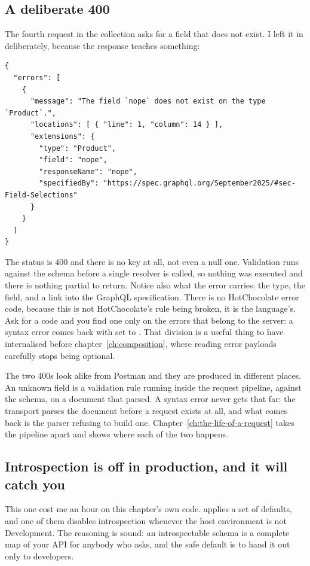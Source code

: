 \subsection*{A deliberate 400}

%
The fourth request in the collection asks for a field that does not exist. I
left it in deliberately, because the response teaches something:

\begin{verbatim}
{
  "errors": [
    {
      "message": "The field `nope` does not exist on the type `Product`.",
      "locations": [ { "line": 1, "column": 14 } ],
      "extensions": {
        "type": "Product",
        "field": "nope",
        "responseName": "nope",
        "specifiedBy": "https://spec.graphql.org/September2025/#sec-Field-Selections"
      }
    }
  ]
}
\end{verbatim}

The status is 400 and there is no  key at all, not even a null one.
Validation runs against the schema before a single resolver is called, so
nothing was executed and there is nothing partial to return. Notice also what
the error carries: the type, the field, and a link into the GraphQL
specification. There is no HotChocolate error code, because this is not
HotChocolate's rule being broken, it is the language's. Ask for a code and you
find one only on the errors that belong to the server: a syntax error comes back
with  set to . That division is a useful
thing to have internalised before chapter~\ref{ch:composition}, where reading
error payloads carefully stops being optional.

The two 400s look alike from Postman and they are produced in different places.
An unknown field is a validation rule running inside the request pipeline,
against the schema, on a document that parsed. A syntax error never gets that
far: the transport parses the document before a request exists at all, and what
comes back is the parser refusing to build one.
Chapter~\ref{ch:the-life-of-a-request} takes the pipeline apart and shows where
each of the two happens.

\subsection*{Introspection is off in production, and it will catch you}

%
This one cost me an hour on this chapter's own code.
 applies a set of defaults, and one of them disables
introspection whenever the host environment is not Development. The reasoning
is sound: an introspectable schema is a complete map of your API for anybody who
asks, and the safe default is to hand it out only to developers.

